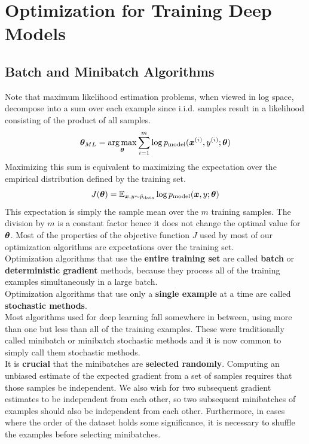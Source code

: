 \section{Optimization for Training Deep Models}
\begin{multicols}{2}
	\subsection{Batch and Minibatch Algorithms}
	Note that maximum likelihood estimation problems, when viewed in log space, decompose into a sum over each example 
	since i.i.d. samples result in a likelihood consisting of the product of all samples.
	\[\bol{\theta}_{ML} = \underset{\bol{\theta}}{\arg \max} \sum_{i=1}^{m} \log p_{\text{model}} (\bol{x}^{(i)},y^{(i)};\bol{\theta}) \]
	Maximizing this sum is equivalent to maximizing the expectation over the empirical distribution defined by the training set.
	\[ J(\bolt) = \Exp_{\vx,y\sim \hat{p}_{\text{data}}} \log p_{\text{model}}(\vx,y;\bolt) \]
	This expectation is simply the sample mean over the $m$ training samples. The division by $m$ is a constant factor hence it does not change the optimal value for $\bolt$.
	Most of the properties of the objective function $J$ used by most of our optimization algorithms are expectations over the training set.\\
	
	Optimization algorithms that use the \textbf{entire training set} are called \textbf{batch} or \textbf{deterministic gradient} methods, because they process all of the training examples simultaneously in a large batch.\\
	
	Optimization algorithms that use only a \textbf{single example} at a time are called \textbf{stochastic methods}.\\
	
	Most algorithms used for deep learning fall somewhere in between, using more than one but less than all of the training examples.
	These were traditionally called minibatch or minibatch stochastic methods and it is now common to simply call them stochastic methods.\\
	
	It is \textbf{crucial} that the minibatches are \textbf{selected randomly}.
	Computing an unbiased estimate of the expected gradient from a set of samples requires that those samples be independent.
	We also wish for two subsequent gradient estimates to be independent from each other, so two subsequent minibatches of examples should also be independent from each other.
	Furthermore, in cases where the order of the dataset holds some significance, it is necessary to shuffle the examples before selecting minibatches.\\
	

\end{multicols}
